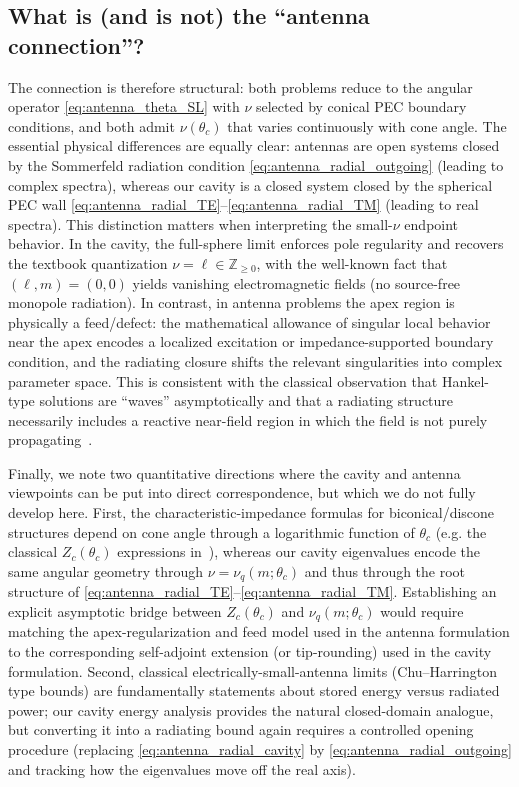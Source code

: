 \documentclass[
  aip,
  amsmath,amssymb,
  preprint
]{revtex4-1}
\begin{document}
\subsection{What is (and is not) the ``antenna connection''?}
\label{sec:antenna:interpretation}
The connection is therefore structural: both problems reduce to the angular operator \eqref{eq:antenna_theta_SL} with $\nu$ selected by conical PEC boundary conditions, and both admit $\nu(\theta_c)$ that varies continuously with cone angle. The essential physical differences are equally clear: antennas are open systems closed by the Sommerfeld radiation condition \eqref{eq:antenna_radial_outgoing} (leading to complex spectra), whereas our cavity is a closed system closed by the spherical PEC wall \eqref{eq:antenna_radial_TE}--\eqref{eq:antenna_radial_TM} (leading to real spectra). This distinction matters when interpreting the small-$\nu$ endpoint behavior. In the cavity, the full-sphere limit enforces pole regularity and recovers the textbook quantization $\nu=\ell\in\mathbb{Z}_{\ge 0}$, with the well-known fact that $(\ell,m)=(0,0)$ yields vanishing electromagnetic fields (no source-free monopole radiation). In contrast, in antenna problems the apex region is physically a feed/defect: the mathematical allowance of singular local behavior near the apex encodes a localized excitation or impedance-supported boundary condition, and the radiating closure shifts the relevant singularities into complex parameter space. This is consistent with the classical observation that Hankel-type solutions are ``waves'' asymptotically and that a radiating structure necessarily includes a reactive near-field region in which the field is not purely propagating~\cite{Schelkunoff1943,Papas1950}.

Finally, we note two quantitative directions where the cavity and antenna viewpoints can be put into direct correspondence, but which we do not fully develop here. First, the characteristic-impedance formulas for biconical/discone structures depend on cone angle through a logarithmic function of $\theta_c$ (e.g. the classical $Z_c(\theta_c)$ expressions in~\cite{Schelkunoff1943,Papas1950}), whereas our cavity eigenvalues encode the same angular geometry through $\nu=\nu_q(m;\theta_c)$ and thus through the root structure of \eqref{eq:antenna_radial_TE}--\eqref{eq:antenna_radial_TM}. Establishing an explicit asymptotic bridge between $Z_c(\theta_c)$ and $\nu_q(m;\theta_c)$ would require matching the apex-regularization and feed model used in the antenna formulation to the corresponding self-adjoint extension (or tip-rounding) used in the cavity formulation. Second, classical electrically-small-antenna limits (Chu--Harrington type bounds) are fundamentally statements about stored energy versus radiated power; our cavity energy analysis provides the natural closed-domain analogue, but converting it into a radiating bound again requires a controlled opening procedure (replacing \eqref{eq:antenna_radial_cavity} by \eqref{eq:antenna_radial_outgoing} and tracking how the eigenvalues move off the real axis).
\end{document}
